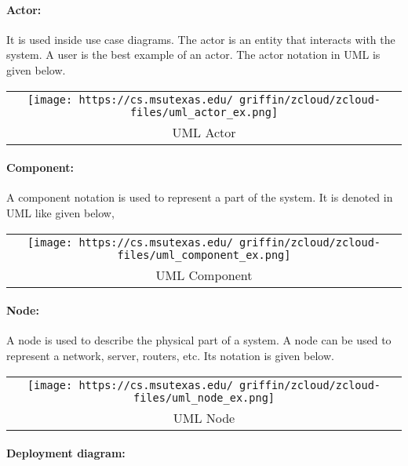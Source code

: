 \documentclass[
]{article}
\begin{document}
\hypertarget{actor}{%
\paragraph{Actor:}\label{actor}}

It is used inside use case diagrams. The actor is an entity that
interacts with the system. A user is the best example of an actor. The
actor notation in UML is given below.

\begin{longtable}[]{@{}c@{}}
\toprule
\endhead
\texttt{[image: https://cs.msutexas.edu/~griffin/zcloud/zcloud-files/uml\_actor\_ex.png]}\tabularnewline
UML Actor\tabularnewline
\bottomrule
\end{longtable}

\hypertarget{component}{%
\paragraph{Component:}\label{component}}

A component notation is used to represent a part of the system. It is
denoted in UML like given below,

\begin{longtable}[]{@{}c@{}}
\toprule
\endhead
\texttt{[image: https://cs.msutexas.edu/~griffin/zcloud/zcloud-files/uml\_component\_ex.png]}\tabularnewline
UML Component\tabularnewline
\bottomrule
\end{longtable}

\hypertarget{node}{%
\paragraph{Node:}\label{node}}

A node is used to describe the physical part of a system. A node can be
used to represent a network, server, routers, etc. Its notation is given
below.

\begin{longtable}[]{@{}c@{}}
\toprule
\endhead
\texttt{[image: https://cs.msutexas.edu/~griffin/zcloud/zcloud-files/uml\_node\_ex.png]}\tabularnewline
UML Node\tabularnewline
\bottomrule
\end{longtable}

\hypertarget{deployment-diagram}{%
\paragraph{Deployment diagram:}\label{deployment-diagram}}
\end{document}
